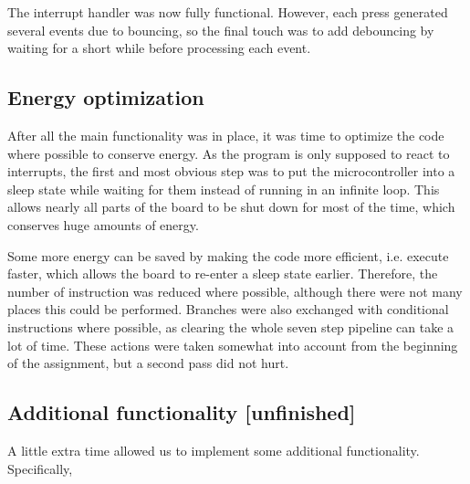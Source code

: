 The interrupt handler was now fully functional. However, each press generated several events due to bouncing, so the final touch was to add debouncing by waiting for a short while before processing each event.
\subsection{Energy optimization}

After all the main functionality was in place, it was time to optimize the code where possible to conserve energy. As the program is only supposed to react to interrupts, the first and most obvious step was to put the microcontroller into a sleep state while waiting for them instead of running in an infinite loop. This allows nearly all parts of the board to be shut down for most of the time, which conserves huge amounts of energy.

Some more energy can be saved by making the code more efficient, i.e. execute faster, which allows the board to re-enter a sleep state earlier. Therefore, the number of instruction was reduced where possible, although there were not many places this could be performed. Branches were also exchanged with conditional instructions where possible, as clearing the whole seven step pipeline can take a lot of time. These actions were taken somewhat into account from the beginning of the assignment, but a second pass did not hurt.
\subsection{Additional functionality [unfinished]}

A little extra time allowed us to implement some additional functionality. Specifically, 
